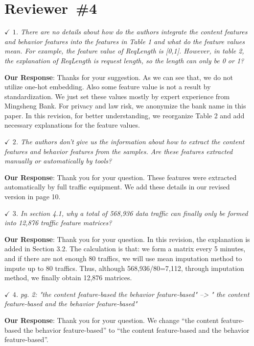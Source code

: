 \documentclass{amsart}
\theoremstyle{definition}
\theoremstyle{remark}
\numberwithin{equation}{section}
\begin{document}
\section*{Reviewer~\#4}
\emph{$\checkmark$ $1$. There are no details about how do the authors integrate the content features and behavior features into the features in Table 1 and what do the feature values mean. For example, the feature value of ReqLength is [0,1]. However, in table 2, the explanation of ReqLength is request length, so the length can only be 0 or 1?}

\textbf{Our Response}:
	Thanks for your suggestion.	As we can see that, we do not 
	utilize one-hot embedding. Also some feature value is not a result by standardization. We just set these values mostly by expert experience from Mingsheng Bank. For privacy and law risk, we anonymize the bank name in this paper. In this revision, for better understanding, we reorganize Table 2 and add necessary explanations for the feature values.	


\emph{$\checkmark$ $2$. The authors don’t give us the information about how to extract the content features and behavior features from the samples. Are these features extracted manually or automatically by tools?}

\textbf{Our Response}:
Thank you for your question. These features were extracted automatically by full traffic equipment. We add these details in our revised version in page 10.


\emph{$\checkmark$ $3$. In section 4.1, why a total of 568,936 data traffic can finally only be formed into 12,876 traffic feature matrices?}

\textbf{Our Response}:
Thank you for your question.
In this revision, the explanation is added in Section 3.2. The calculation is that: we form a matrix every 5 minutes, and if there are not enough 80 traffics, we will use mean imputation method to impute
up to 80 traffics. Thus, although 568,936/80=7,112, through imputation method, we finally obtain 12,876 matrices.



\emph{$\checkmark$ $4$. pg. 2: "the content feature-based the behavior feature-based" --> " the content feature-based and the behavior feature-based"}

\textbf{Our Response}:
Thank you for your question. We change ``the content feature-based the behavior feature-based'' to ``the content feature-based and the behavior feature-based''.
\end{document}
